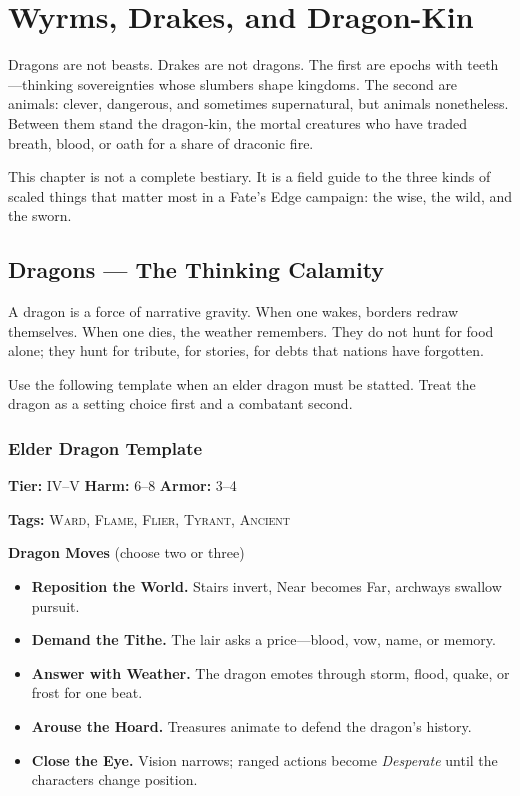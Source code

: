 \chapter{Wyrms, Drakes, and Dragon-Kin}

Dragons are not beasts. Drakes are not dragons. The first are epochs with teeth---thinking sovereignties whose slumbers shape kingdoms. The second are animals: clever, dangerous, and sometimes supernatural, but animals nonetheless. Between them stand the dragon-kin, the mortal creatures who have traded breath, blood, or oath for a share of draconic fire.

This chapter is not a complete bestiary. It is a field guide to the three kinds of scaled things that matter most in a Fate's Edge campaign: the wise, the wild, and the sworn.

\section{Dragons --- The Thinking Calamity}

A dragon is a force of narrative gravity. When one wakes, borders redraw themselves. When one dies, the weather remembers. They do not hunt for food alone; they hunt for tribute, for stories, for debts that nations have forgotten.

Use the following template when an elder dragon must be statted. Treat the dragon as a setting choice first and a combatant second.

\subsection*{Elder Dragon Template}

\noindent
\textbf{Tier:} IV--V \hfill
\textbf{Harm:} 6--8 \hfill
\textbf{Armor:} 3--4

\medskip
\noindent
\textbf{Tags:} \textsc{Ward}, \textsc{Flame}, \textsc{Flier}, \textsc{Tyrant}, \textsc{Ancient}

\medskip
\noindent
\textbf{Dragon Moves} (choose two or three)
\begin{itemize}
  \item \textbf{Reposition the World.} Stairs invert, Near becomes Far, archways swallow pursuit.
  \item \textbf{Demand the Tithe.} The lair asks a price---blood, vow, name, or memory.
  \item \textbf{Answer with Weather.} The dragon emotes through storm, flood, quake, or frost for one beat.
  \item \textbf{Arouse the Hoard.} Treasures animate to defend the dragon's history.
  \item \textbf{Close the Eye.} Vision narrows; ranged actions become \emph{Desperate} until the characters change position.
\end{itemize}


